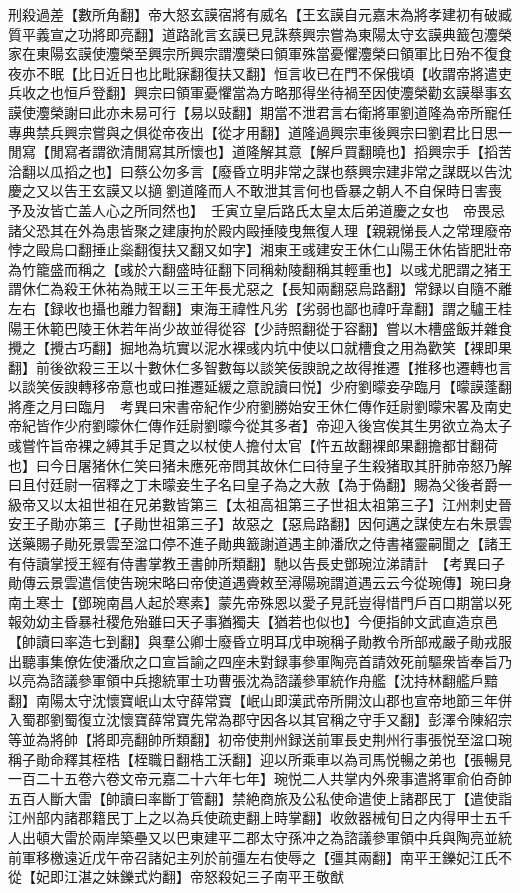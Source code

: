 刑殺過差【數所角翻】帝大怒玄謨宿將有威名【王玄謨自元嘉末為將孝建初有破臧質平義宣之功將即亮翻】道路訛言玄謨已見誅蔡興宗嘗為東陽太守玄謨典籖包灋榮家在東陽玄謨使灋榮至興宗所興宗謂灋榮曰領軍殊當憂懼灋榮曰領軍比日殆不復食夜亦不眠【比日近日也比毗寐翻復扶又翻】恒言收已在門不保俄頃【收謂帝將遣吏兵收之也恒戶登翻】興宗曰領軍憂懼當為方略那得坐待禍至因使灋榮勸玄謨舉事玄謨使灋榮謝曰此亦未易可行【易以䜴翻】期當不泄君言右衛將軍劉道隆為帝所寵任專典禁兵興宗嘗與之俱從帝夜出【從才用翻】道隆過興宗車後興宗曰劉君比日思一閒寫【閒寫者謂欲清閒寫其所懷也】道隆解其意【解戶買翻曉也】搯興宗手【搯苦洽翻以瓜搯之也】曰蔡公勿多言【廢昏立明非常之謀也蔡興宗建非常之謀既以告沈慶之又以告王玄謨又以擿劉道隆而人不敢泄其言何也昏暴之朝人不自保時日害喪予及汝皆亡盖人心之所同然也】　壬寅立皇后路氏太皇太后弟道慶之女也　帝畏忌諸父恐其在外為患皆聚之建康拘於殿内毆捶陵曳無復人理【親親悌長人之常理廢帝悖之毆烏口翻捶止橤翻復扶又翻又如字】湘東王彧建安王休仁山陽王休佑皆肥壯帝為竹籠盛而稱之【彧於六翻盛時征翻下同稱勑陵翻稱其輕重也】以彧尤肥謂之猪王謂休仁為殺王休祐為賊王以三王年長尤惡之【長知兩翻惡烏路翻】常録以自隨不離左右【録收也攝也離力智翻】東海王禕性凡劣【劣弱也鄙也禕吁韋翻】謂之驢王桂陽王休範巴陵王休若年尚少故並得從容【少詩照翻從于容翻】嘗以木槽盛飯并雜食攪之【攪古巧翻】掘地為坑實以泥水裸彧内坑中使以口就槽食之用為歡笑【裸即果翻】前後欲殺三王以十數休仁多智數每以談笑佞諛說之故得推遷【推移也遷轉也言以談笑佞諛轉移帝意也或曰推遷延緩之意說讀曰悦】少府劉曚妾孕臨月【曚謨蓬翻將產之月曰臨月　考異曰宋書帝紀作少府劉勝始安王休仁傳作廷尉劉曚宋畧及南史帝紀皆作少府劉曚休仁傳作廷尉劉曚今從其多者】帝迎入後宫俟其生男欲立為太子彧嘗忤旨帝裸之縛其手足貫之以杖使人擔付太官【忤五故翻裸郎果翻擔都甘翻荷也】曰今日屠猪休仁笑曰猪未應死帝問其故休仁曰待皇子生殺猪取其肝肺帝怒乃解曰且付廷尉一宿釋之丁未曚妾生子名曰皇子為之大赦【為于偽翻】賜為父後者爵一級帝又以太祖世祖在兄弟數皆第三【太祖高祖第三子世祖太祖第三子】江州刺史晉安王子勛亦第三【子勛世祖第三子】故惡之【惡烏路翻】因何邁之謀使左右朱景雲送藥賜子勛死景雲至湓口停不進子勛典籖謝道遇主帥潘欣之侍書褚靈嗣聞之【諸王有侍讀掌授王經有侍書掌教王書帥所類翻】馳以告長史鄧琬泣涕請計　【考異曰子勛傳云景雲遣信使告琬宋略曰帝使道遇賫敕至潯陽琬謂道遇云云今從琬傳】琬曰身南土寒士【鄧琬南昌人起於寒素】蒙先帝殊恩以愛子見託豈得惜門戶百口期當以死報効幼主昏暴社稷危殆雖曰天子事猶獨夫【猶若也似也】今便指帥文武直造京邑【帥讀曰率造七到翻】與羣公卿士廢昏立明耳戊申琬稱子勛教令所部戒嚴子勛戎服出聽事集僚佐使潘欣之口宣旨諭之四座未對録事參軍陶亮首請效死前驅衆皆奉旨乃以亮為諮議參軍領中兵摠統軍士功曹張沈為諮議參軍統作舟艦【沈持林翻艦戶黯翻】南陽太守沈懷寶岷山太守薛常寶【岷山即漢武帝所開汶山郡也宣帝地節三年併入蜀郡劉蜀復立沈懷寶薛常寶先常為郡守因各以其官稱之守手又翻】彭澤令陳紹宗等並為將帥【將即亮翻帥所類翻】初帝使荆州録送前軍長史荆州行事張悦至湓口琬稱子勛命釋其桎梏【桎職日翻梏工沃翻】迎以所乘車以為司馬悦暢之弟也【張暢見一百二十五卷六卷文帝元嘉二十六年七年】琬悦二人共掌内外衆事遣將軍俞伯奇帥五百人斷大雷【帥讀曰率斷丁管翻】禁絶商旅及公私使命遣使上諸郡民丁【遣使詣江州部内諸郡籍民丁上之以為兵使疏吏翻上時掌翻】收斂器械旬日之内得甲士五千人出頓大雷於兩岸築壘又以巴東建平二郡太守孫冲之為諮議參軍領中兵與陶亮並統前軍移檄遠近戊午帝召諸妃主列於前彊左右使辱之【彊其兩翻】南平王鑠妃江氏不從【妃即江湛之妹鑠式灼翻】帝怒殺妃三子南平王敬猷